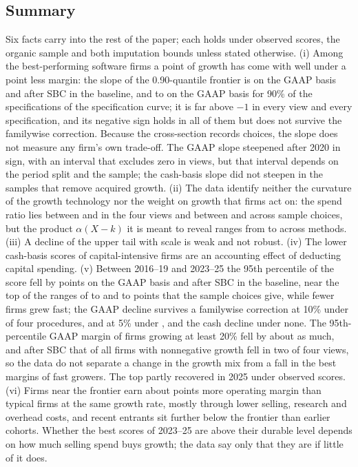 \subsection{Summary}
Six facts carry into the rest of the paper; each holds under observed scores, the organic sample and both imputation bounds unless stated otherwise. (i) Among the best-performing software firms a point of growth has come with well under a point less margin: the slope of the 0.90-quantile frontier is \PsiOpEone{} on the GAAP basis and \PsiCashEone{} after SBC in the baseline, and \ScPsiOpPLo{} to \ScPsiOpPHi{} on the GAAP basis for 90\% of the specifications of the specification curve; it is far above $-1$ in every view and every specification, and its negative sign holds in all of them but does not survive the familywise correction. Because the cross-section records choices, the slope does not measure any firm's own trade-off. The GAAP slope steepened after 2020 in sign, with an interval that excludes zero in \PsiDiffOpCountNeg{} views, but that interval depends on the period split and the sample; the cash-basis slope did not steepen in the samples that remove acquired growth. (ii) The data identify neither the curvature of the growth technology nor the weight on growth that firms act on: the spend ratio lies between \SpendLo{} and \SpendHi{} in the four views and between \ScSpendMin{} and \ScSpendMax{} across sample choices, but the product $\alpha(X-k)$ it is meant to reveal ranges from \AlphaAllLo{} to \AlphaAllHi{} across methods. (iii) A decline of the upper tail with scale is weak and not robust. (iv) The lower cash-basis scores of capital-intensive firms are an accounting effect of deducting capital spending. (v) Between 2016--19 and 2023--25 the 95th percentile of the score fell by \TopFallOpEone{} points on the GAAP basis and \TopFallCashEone{} after SBC in the baseline, near the top of the ranges of \ScTopOpCoreFallLo{} to \ScTopOpCoreFallHi{} and \ScTopCashCoreFallLo{} to \ScTopCashCoreFallHi{} points that the sample choices give, while fewer firms grew fast; the GAAP decline survives a familywise correction at 10\% under \TopFamTen{} of four procedures, and at 5\% under \TopFamFive, and the cash decline under none. The 95th-percentile GAAP margin of firms growing at least 20\% fell by about as much, and after SBC that of all firms with nonnegative growth fell in two of four views, so the data do not separate a change in the growth mix from a fall in the best margins of fast growers. The top partly recovered in 2025 under observed scores. (vi) Firms near the frontier earn about \GapV{} points more operating margin than typical firms at the same growth rate, mostly through lower selling, research and overhead costs, and recent entrants sit further below the frontier than earlier cohorts. Whether the best scores of 2023--25 are above their durable level depends on how much selling spend buys growth; the data say only that they are if little of it does.
